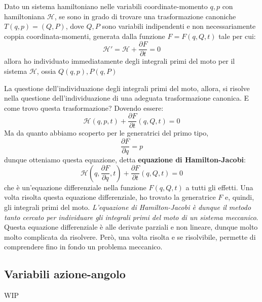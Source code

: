 \documentclass[a4paper,openany]{article}
\begin{document}
\begin{tcolorbox}
	Dato un sistema hamiltoniano nelle variabili coordinate-momento $q,p$ con hamiltoniana $\mathcal{H}$, se sono in grado di trovare una trasformazione canoniche $T(q,p) = (Q,P)$, dove $Q,P$ sono variabili indipendenti e non necessariamente coppia coordinata-momenti, generata dalla funzione $F=F(q,Q,t)$ tale per cui:
	\begin{equation}\label{key}
		\mathcal{H}' = \mathcal{H}+\dfrac{\partial F}{\partial t} = 0
	\end{equation}
allora ho individuato immediatamente degli integrali primi del moto per il sistema $\mathcal{H}$, ossia $Q(q,p), P(q,P)$
\end{tcolorbox}
La questione dell'individuazione degli integrali primi del moto, allora, si risolve nella questione dell'individuazione di una adeguata trasformazione canonica. E come trovo questa trasformazione? Dovendo essere:
\begin{equation}\label{key}
	\mathcal{H}(q,p,t)+\dfrac{\partial F}{\partial t}(q,Q,t) = 0
\end{equation}
Ma da quanto abbiamo scoperto per le generatrici del primo tipo,
\begin{equation}\label{key}
	\dfrac{\partial F}{\partial q} = p
\end{equation}
dunque otteniamo questa equazione, detta \textbf{equazione di Hamilton-Jacobi}:
\begin{equation}\label{key}
	\mathcal{H}(q,\dfrac{\partial F}{\partial q},t)+\dfrac{\partial F}{\partial t}(q,Q,t) = 0
\end{equation}
che è un'equazione differenziale nella funzione $F(q,Q,t)$ a tutti gli effetti. Una volta risolta questa equazione differenziale, ho trovato la generatrice $F$ e, quindi, gli integrali primi del moto. \textit{L'equazione di Hamilton-Jacobi è dunque il metodo tanto cercato per individuare gli integrali primi del moto di un sistema meccanico}. Questa equazione differenziale è alle derivate parziali e non lineare, dunque molto molto complicata da risolvere. Però, una volta risolta e se risolvibile, permette di comprendere fino in fondo un problema meccanico.
\subsection{Variabili azione-angolo}
	WIP
\end{document}
